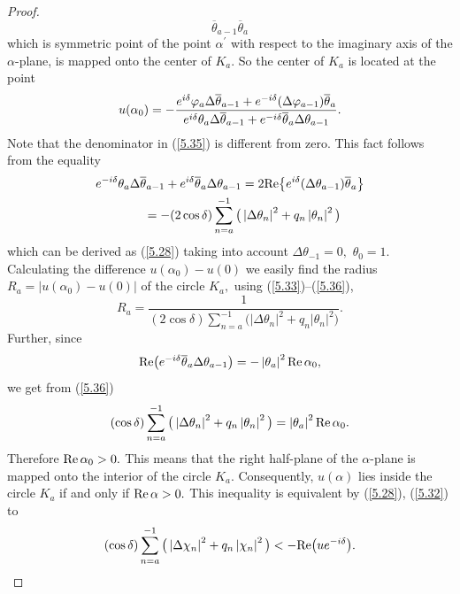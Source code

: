 \documentclass[pdftex]{sigma}
\numberwithin{equation}{section}
\begin{document}
\begin{proof}
\[{\overline{\theta }_{a-1}}{\overline{\theta }_{a}}
\]%
which is symmetric point of the point $\alpha ^{\prime }$ with respect to
the imaginary axis of the $\alpha $-plane, is mapped onto the center of $%
K_{a}.$ So the center of $K_{a}$ is located at the point%
\begin{equation}
u(\alpha _{0})=-\frac{e^{i\delta }\varphi _{a}\Delta \overline{\theta }%
_{a-1}+e^{-i\delta }(\Delta \varphi _{a-1})\overline{\theta }_{a}}{%
e^{i\delta }\theta _{a}\Delta \overline{\theta }_{a-1}+e^{-i\delta }%
\overline{\theta }_{a}\Delta \theta _{a-1}}.  \label{5.35}
\end{equation}%
Note that the denominator in (\ref{5.35}) is dif\/ferent from zero. This fact
follows from the equality%
\begin{gather}
e^{-i\delta }\theta _{a}\Delta \overline{\theta }_{a-1}+e^{i\delta }%
\overline{\theta }_{a}\Delta \theta _{a-1}=2{\rm Re}\big\{ e^{i\delta
}(\Delta \theta _{a-1})\overline{\theta }_{a}\big\}\nonumber\\
\qquad {}=-(2\cos \delta )\sum_{n=a}^{-1}\big( \left\vert \Delta \theta
_{n}\right\vert ^{2}+q_{n}\left\vert \theta _{n}\right\vert ^{2}\big)
\label{5.36}
\end{gather}%
which can be derived as (\ref{5.28}) taking into account $\Delta \theta
_{-1}=0,$ $\theta _{0}=1.$ Calculating the dif\/ference $u(\alpha _{0})-u(0)$
we easily f\/ind the radius $R_{a}=\left\vert u(\alpha _{0})-u(0)\right\vert $
of the circle $K_{a},$ using (\ref{5.33})--(\ref{5.36}),%
\[
R_{a}=\frac{1}{(2\cos \delta )\sum\limits_{n=a}^{-1}\big( \left\vert \Delta \theta
_{n}\right\vert ^{2}+q_{n}\left\vert \theta _{n}\right\vert ^{2}\big) }.
\]%
Further, since%
\[
{\rm Re}\big(e^{-i\delta }\overline{\theta }_{a}\Delta \theta
_{a-1}\big)=-\left\vert \theta _{a}\right\vert ^{2}{\rm Re}\,\alpha _{0},
\]%
we get from (\ref{5.36})%
\[
(\cos \delta )\sum_{n=a}^{-1}\big( \left\vert \Delta \theta _{n}\right\vert
^{2}+q_{n}\left\vert \theta _{n}\right\vert ^{2}\big) =\left\vert \theta
_{a}\right\vert ^{2}{\rm Re}\,\alpha _{0}.
\]%
Therefore ${\rm Re}\,\alpha _{0}>0.$ This means that the right half-plane
of the $\alpha $-plane is mapped onto the interior of the circle $K_{a}.$
Consequently, $u(\alpha )$ lies inside the circle $K_{a}$ if and only if $%
{\rm Re}\,\alpha >0.$ This inequality is equivalent by (\ref{5.28}), (\ref{5.32}) to
\begin{equation}
(\cos \delta )\sum_{n=a}^{-1}\big( \left\vert \Delta \chi _{n}\right\vert
^{2}+q_{n}\left\vert \chi _{n}\right\vert ^{2}\big) <-{\rm Re}
\big(ue^{-i\delta }\big).  \label{5.37}
\end{equation}


\end{proof}
\end{document}
